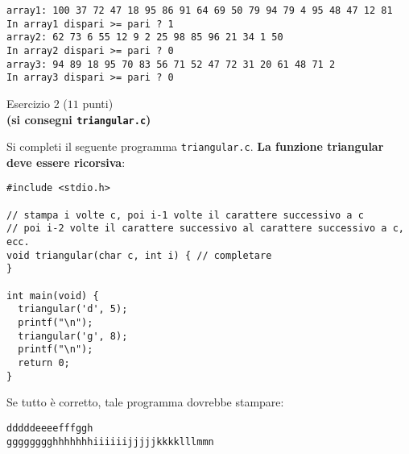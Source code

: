 \documentclass[12pt]{article}
\begin{document}
\begin{mdframed}[backgroundcolor=lightgrey] 
\begin{verbatim}
array1: 100 37 72 47 18 95 86 91 64 69 50 79 94 79 4 95 48 47 12 81 
In array1 dispari >= pari ? 1
array2: 62 73 6 55 12 9 2 25 98 85 96 21 34 1 50 
In array2 dispari >= pari ? 0
array3: 94 89 18 95 70 83 56 71 52 47 72 31 20 61 48 71 2 
In array3 dispari >= pari ? 0
\end{verbatim}
\end{mdframed}

\begin{center}
  {\Large Esercizio 2} ($11$ punti)\\
  \textbf{(si consegni \texttt{triangular.c})}
\end{center}
%
Si completi il seguente programma \texttt{triangular.c}.
\textbf{La funzione triangular deve essere ricorsiva}:

\begin{center}
  \begin{lstlisting}[language=myC]
#include <stdio.h>

// stampa i volte c, poi i-1 volte il carattere successivo a c
// poi i-2 volte il carattere successivo al carattere successivo a c, ecc.
void triangular(char c, int i) { // completare
}

int main(void) {
  triangular('d', 5);
  printf("\n");
  triangular('g', 8);
  printf("\n");
  return 0;
}
  \end{lstlisting}
\end{center}

Se tutto \`e corretto, tale programma dovrebbe stampare:

\begin{mdframed}[backgroundcolor=lightgrey] 
\begin{verbatim}
dddddeeeefffggh
gggggggghhhhhhhiiiiiijjjjjkkkklllmmn
\end{verbatim}
\end{mdframed}
\end{document}
